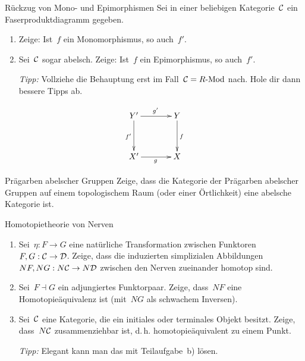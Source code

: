 \documentclass{uebblatt}
\begin{document}

\begin{aufgabe}{Rückzug von Mono- und Epimorphismen}
Sei in einer beliebigen Kategorie~$\mathcal{C}$ ein Faserproduktdiagramm gegeben.
\begin{enumerate}
\item Zeige: Ist~$f$ ein Monomorphismus, so auch~$f'$.
\item Sei~$\mathcal{C}$ sogar abelsch. Zeige: Ist~$f$ ein Epimorphismus, so auch~$f'$.

{\tiny\emph{Tipp:} Vollziehe die Behauptung erst im Fall~$\mathcal{C} = R\text{-}\mathrm{Mod}$ nach. Hole
dir dann bessere Tipps ab.\par}
\end{enumerate}
\[ \xymatrixcolsep{3pc}\xymatrixrowsep{3pc}\xymatrix{
  Y' \ar[r]^{g'} \ar[d]_{f'} & Y \ar[d]^f \\
  X' \ar[r]_g & X
} \]
\end{aufgabe}

\newpage

\begin{aufgabe}{Prägarben abelscher Gruppen}
Zeige, dass die Kategorie der Prägarben abelscher Gruppen auf einem
topologischem Raum (oder einer Örtlichkeit) eine abelsche Kategorie ist.
\end{aufgabe}

\begin{aufgabe}{Homotopietheorie von Nerven}
\begin{enumerate}
\item Sei~$\eta : F \to G$ eine natürliche Transformation zwischen
Funktoren~$F,G : \mathcal{C} \to \mathcal{D}$. Zeige, dass die induzierten simplizialen
Abbildungen~$NF, NG : N\mathcal{C} \to N\mathcal{D}$ zwischen den Nerven zueinander homotop
sind.
\item Sei~$F \dashv G$ ein adjungiertes Funktorpaar. Zeige, dass~$NF$ eine
Homotopieäquivalenz ist (mit~$NG$ als schwachem Inversen).
\item Sei~$\mathcal{C}$ eine Kategorie, die ein initiales oder terminales Objekt
besitzt. Zeige, dass~$N\mathcal{C}$ zusammenziehbar ist, d.\,h. homotopieäquivalent zu
einem Punkt.

{\tiny\emph{Tipp:} Elegant kann man das mit Teilaufgabe~b) lösen.\par}
\end{enumerate}
\end{aufgabe}
\end{document}
